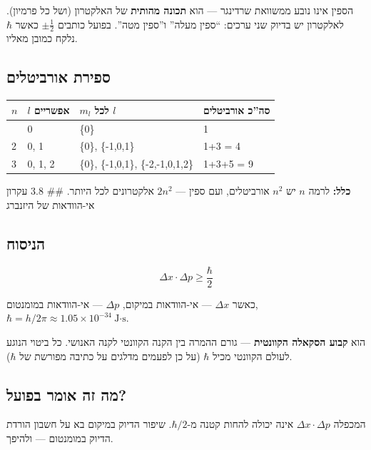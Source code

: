 \documentclass[
  hebrew,
  letterpaper,
  DIV=11,
  numbers=noendperiod]{scrreprt}
\newcounter{none} %
\begin{document}
הספין אינו נובע ממשוואת שרדינגר --- הוא \textbf{תכונה מהותית} של
האלקטרון (ושל כל פרמיון). לאלקטרון יש בדיוק שני ערכים: ``ספין מעלה''
ו''ספין מטה''. בפועל כותבים \(\pm\frac{1}{2}\) כאשר \(\hbar\) נלקח כמובן
מאליו.

\subsection{ספירת
אורביטלים}\label{ux5e1ux5e4ux5d9ux5e8ux5ea-ux5d0ux5d5ux5e8ux5d1ux5d9ux5d8ux5dcux5d9ux5dd}

{\def\LTcaptype{none} %
\begin{longtable}[]{@{}llll@{}}
\toprule\noalign{}
\(n\) & \(l\) אפשריים & \(m_l\) לכל \(l\) & סה''כ אורביטלים \\
\midrule\noalign{}
\endhead
\bottomrule\noalign{}
\endlastfoot
1 & 0 & \{0\} & 1 \\
2 & 0, 1 & \{0\}, \{-1,0,1\} & 1+3 = 4 \\
3 & 0, 1, 2 & \{0\}, \{-1,0,1\}, \{-2,-1,0,1,2\} & 1+3+5 = 9 \\
\end{longtable}
}

\textbf{כלל:} לרמה \(n\) יש \(n^2\) אורביטלים, ועם ספין --- \(2n^2\)
אלקטרונים לכל היותר. \#\# 3.8 עקרון אי-הוודאות של היזנברג

\subsection{הניסוח}\label{ux5d4ux5e0ux5d9ux5e1ux5d5ux5d7}

\[\Delta x \cdot \Delta p \geq \frac{\hbar}{2}\]

כאשר \(\Delta x\) --- אי-הוודאות במיקום, \(\Delta p\) --- אי-הוודאות
במומנטום, \(\hbar = h/2\pi \approx 1.05\times10^{-34}\ \text{J·s}\).

הוא \textbf{קבוע הסקאלה הקוונטית} --- גורם ההמרה בין הקנה הקוונטי לקנה
האנושי. כל ביטוי הנוגע לעולם הקוונטי מכיל \(\hbar\) (על כן לפעמים מדלגים
על כתיבה מפורשת של \(\hbar\)).

\subsection{מה זה אומר
בפועל?}\label{ux5deux5d4-ux5d6ux5d4-ux5d0ux5d5ux5deux5e8-ux5d1ux5e4ux5d5ux5e2ux5dc}

המכפלה \(\Delta x \cdot \Delta p\) אינה יכולה להחות קטנה מ-\(\hbar/2\).
שיפור הדיוק במיקום בא על חשבון הורדת הדיוק במומנטום --- ולהיפך.
\end{document}
